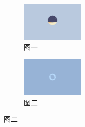 \documentclass{ctexbook}
\begin{document}
\begin{figure}[htbp]
    \centering
    \begin{subfigure}{15em}
        \centering
        \includegraphics[width=3cm]{1.png}
        \caption{图一}
    \end{subfigure}
    \qquad
    \begin{subfigure}{15em}
        \centering
        \includegraphics[width=3cm]{2.png}
        \caption{图二}
    \end{subfigure}
\end{figure}
\end{document}
